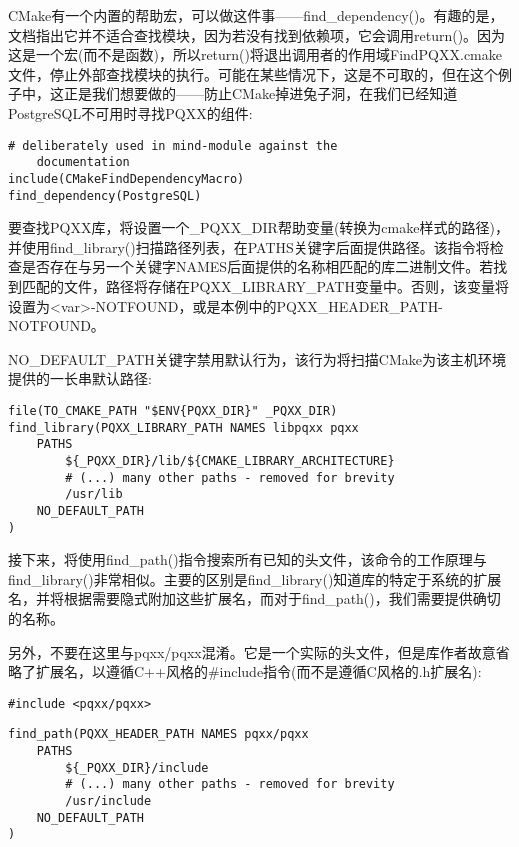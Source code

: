 CMake有一个内置的帮助宏，可以做这件事——find\_dependency()。有趣的是，文档指出它并不适合查找模块，因为若没有找到依赖项，它会调用return()。因为这是一个宏(而不是函数)，所以return()将退出调用者的作用域FindPQXX.cmake文件，停止外部查找模块的执行。可能在某些情况下，这是不可取的，但在这个例子中，这正是我们想要做的——防止CMake掉进兔子洞，在我们已经知道PostgreSQL不可用时寻找PQXX的组件:

\begin{lstlisting}[style=styleCMake]
# deliberately used in mind-module against the
	documentation
include(CMakeFindDependencyMacro)
find_dependency(PostgreSQL)
\end{lstlisting}

要查找PQXX库，将设置一个\_PQXX\_DIR帮助变量(转换为cmake样式的路径)，并使用find\_library()扫描路径列表，在PATHS关键字后面提供路径。该指令将检查是否存在与另一个关键字NAMES后面提供的名称相匹配的库二进制文件。若找到匹配的文件，路径将存储在PQXX\_LIBRARY\_PATH变量中。否则，该变量将设置为<var>-NOTFOUND，或是本例中的PQXX\_HEADER\_PATH-NOTFOUND。

NO\_DEFAULT\_PATH关键字禁用默认行为，该行为将扫描CMake为该主机环境提供的一长串默认路径:

\begin{lstlisting}[style=styleCMake]
file(TO_CMAKE_PATH "$ENV{PQXX_DIR}" _PQXX_DIR)
find_library(PQXX_LIBRARY_PATH NAMES libpqxx pqxx
	PATHS
		${_PQXX_DIR}/lib/${CMAKE_LIBRARY_ARCHITECTURE}
		# (...) many other paths - removed for brevity
		/usr/lib
	NO_DEFAULT_PATH
)
\end{lstlisting}

接下来，将使用find\_path()指令搜索所有已知的头文件，该命令的工作原理与find\_library()非常相似。主要的区别是find\_library()知道库的特定于系统的扩展名，并将根据需要隐式附加这些扩展名，而对于find\_path()，我们需要提供确切的名称。

另外，不要在这里与pqxx/pqxx混淆。它是一个实际的头文件，但是库作者故意省略了扩展名，以遵循C++风格的\#include指令(而不是遵循C风格的.h扩展名):

\begin{lstlisting}[style=styleCXX]
#include <pqxx/pqxx>
\end{lstlisting}

\begin{lstlisting}[style=styleCMake]
find_path(PQXX_HEADER_PATH NAMES pqxx/pqxx
	PATHS
		${_PQXX_DIR}/include
		# (...) many other paths - removed for brevity
		/usr/include
	NO_DEFAULT_PATH
)
\end{lstlisting}

